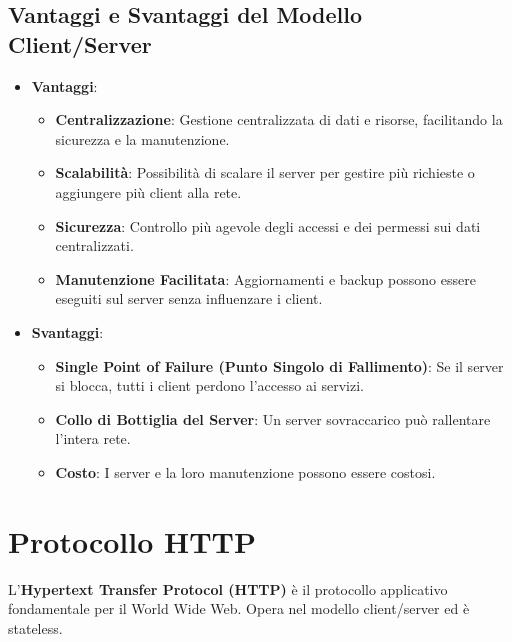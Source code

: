\subsection{Vantaggi e Svantaggi del Modello Client/Server}
\begin{itemize}
    \item \textbf{Vantaggi}:
    \begin{itemize}
        \item \textbf{Centralizzazione}: Gestione centralizzata di dati e risorse, facilitando la sicurezza e la manutenzione.
        \item \textbf{Scalabilità}: Possibilità di scalare il server per gestire più richieste o aggiungere più client alla rete.
        \item \textbf{Sicurezza}: Controllo più agevole degli accessi e dei permessi sui dati centralizzati.
        \item \textbf{Manutenzione Facilitata}: Aggiornamenti e backup possono essere eseguiti sul server senza influenzare i client.
    \end{itemize}
    \item \textbf{Svantaggi}:
    \begin{itemize}
        \item \textbf{Single Point of Failure (Punto Singolo di Fallimento)}: Se il server si blocca, tutti i client perdono l'accesso ai servizi.
        \item \textbf{Collo di Bottiglia del Server}: Un server sovraccarico può rallentare l'intera rete.
        \item \textbf{Costo}: I server e la loro manutenzione possono essere costosi.
    \end{itemize}
\end{itemize}

\section{Protocollo HTTP}
L'\textbf{Hypertext Transfer Protocol (HTTP)} è il protocollo applicativo fondamentale per il World Wide Web. Opera nel modello client/server ed è stateless.

